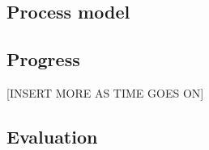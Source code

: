 \subsection{Process model}
\label{subsec:project_evaluation-development-process_model}


\subsection{Progress}
\label{subsec:project_evaluation-development-progress}




[INSERT MORE AS TIME GOES ON]

\subsection{Evaluation}
\label{subsec:project_evaluation-development-evaluation}

